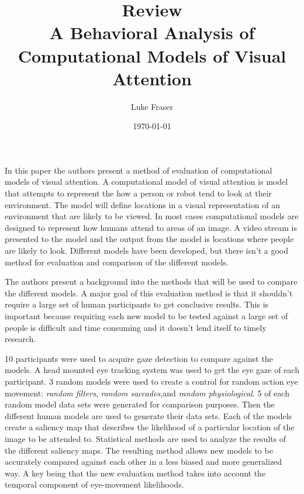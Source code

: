 \documentclass{article}
\begin{document}
\title{{\large Review} \\ A Behavioral Analysis of Computational Models of Visual Attention}
\author{Luke Fraser}
\date{\today}
\maketitle

\begingroup
\renewcommand{\section}[2]{}


\endgroup

\section*{Summary}
In this paper the authors present a method of evaluation of computational models of visual attention. A computational model of visual attention is model that attempts to represent the how a person or robot tend to look at their environment. The model will define locations in a visual representation of an environment that are likely to be viewed. In most cases computational models are designed to represent how humans attend to areas of an image. A video stream is presented to the model and the output from the model is locations where people are likely to look. Different models have been developed, but there isn't a good method for evaluation and comparison of the different models.

The authors present a background into the methods that will be used to compare the different models. A major goal of this evaluation method is that it shouldn't require a large set of human participants to get conclusive results. This is important because requiring each new model to be tested against a large set of people is difficult and time consuming and it doesn't lend itself to timely research.

10 participants were used to acquire gaze detection to compare against the models. A head mounted eye tracking system was used to get the eye gaze of each participant. 3 random models were used to create a control for random action eye movement: \emph{random filters}, \emph{random saccades},and \emph{random physiological}. 5 of each random model data sets were generated for comparison purposes. Then the different human models are used to generate their data sets. Each of the models create a saliency map that describes the likelihood of a particular location of the image to be attended to. Statistical methods are used to analyze the results of the different saliency maps. The resulting method allows new models to be accurately compared against each other in a less biased and more generalized way. A key being that the new evaluation method takes into account the temporal component of eye-movement likelihoods.
\end{document}
